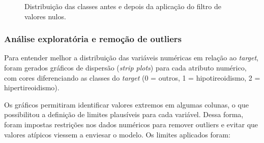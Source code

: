 \documentclass[11pt]{article}
\begin{document}
\begin{figure}[H]
    \centering
    \hfill
    \caption{Distribuição das classes antes e depois da aplicação do filtro de valores nulos.}
    \label{fig:pie-before-after}
\end{figure}

\subsubsection{Análise exploratória e remoção de outliers}

Para entender melhor a distribuição das variáveis numéricas em relação ao \textit{target}, foram gerados gráficos de dispersão (\textit{strip plots}) para cada atributo numérico, com cores diferenciando as classes do \textit{target} (0 = outros, 1 = hipotireoidismo, 2 = hipertireoidismo). 

Os gráficos permitiram identificar valores extremos em algumas colunas, o que possibilitou a definição de limites plausíveis para cada variável. Dessa forma, foram impostas restrições nos dados numéricos para remover outliers e evitar que valores atípicos viessem a enviesar o modelo. Os limites aplicados foram:
\end{document}
